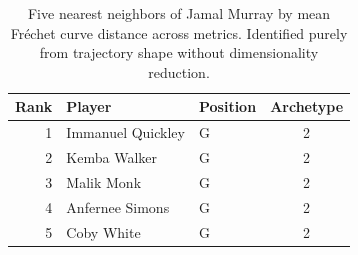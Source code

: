 \begin{table}[htbp]
  \centering\small
  \begin{tabular}{rllc}
    \toprule
    Rank & Player & Position & Archetype \\
    \midrule
    1 & Immanuel Quickley & G & 2 \\
    2 & Kemba Walker & G & 2 \\
    3 & Malik Monk & G & 2 \\
    4 & Anfernee Simons & G & 2 \\
    5 & Coby White & G & 2 \\
    \bottomrule
  \end{tabular}
  \caption{Five nearest neighbors of Jamal Murray by mean Fr\'{e}chet curve distance across metrics. Identified purely from trajectory shape without dimensionality reduction.}
  \label{tab:Jamal_Murray_frechet_curve_neighbors}
\end{table}

